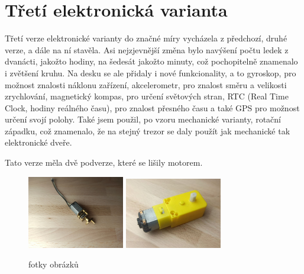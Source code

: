 \section*{Třetí elektronická varianta}

Třetí verze elektronické varianty do značné míry vycházela z předchozí, druhé verze, a dále na ní stavěla. Asi nejzjevnější změna bylo navýšení počtu 
ledek z dvanácti, jakožto hodiny, na šedesát jakožto minuty, což pochopitelně znamenalo i zvětšení kruhu. Na desku se ale přidaly i nové funkcionality,
a to gyroskop, pro možnost znalosti náklonu zařízení, akcelerometr, pro znalost směru a velikosti zrychlování, magnetický kompas, pro určení světových
stran, RTC (Real Time Clock, hodiny reálného času), pro znalost přesného času a také GPS pro možnost určení svojí polohy.
Také jsem použil, po vzoru mechanické varianty, rotační západku, což znamenalo, že na stejný trezor se daly použít jak mechanické tak 
elektronické dveře.

Tato verze měla dvě podverze, které se lišily motorem.
\begin{figure}[htbp]
    \centering
    \includegraphics[width=160]{kapitoly/obrazky/E3/motory/hodinovyStrojek.jpg}
    \includegraphics[width=160]{kapitoly/obrazky/E3/motory/zluty_motor.jpg}
    \caption{fotky obrázků}
    \label{fig:E3-motory}
\end{figure}


